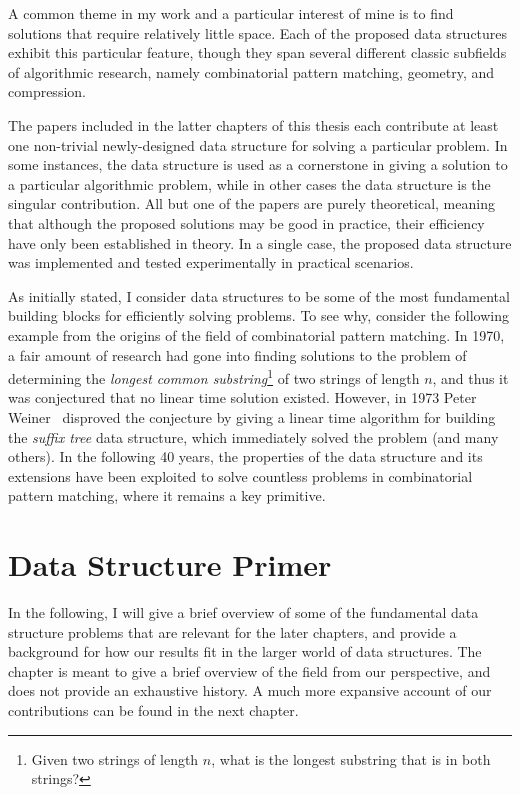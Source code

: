 A common theme in my work and a particular interest of mine is to find solutions that require relatively little space. Each of the proposed data structures exhibit this particular feature, though they span several different classic subfields of algorithmic research, namely combinatorial pattern matching, geometry, and compression. 

The papers included in the latter chapters of this thesis each contribute at least one non-trivial newly-designed data structure for solving a particular problem. In some instances, the data structure is used as a cornerstone in giving a solution to a particular algorithmic problem, while in other cases the data structure is the singular contribution. All but one of the papers are purely theoretical, meaning that although the proposed solutions may be good in practice, their efficiency have only been established in theory. In a single case, the proposed data structure was implemented and tested experimentally in practical scenarios.

As initially stated, I consider data structures to be some of the most fundamental building blocks for efficiently solving problems. To see why, consider the following example from the origins of the field of combinatorial pattern matching. In 1970, a fair amount of research had gone into finding solutions to the problem of determining the \emph{longest common substring}\footnote{Given two strings of length $n$, what is the longest substring that is in both strings?} of two strings of length $n$, and thus it was conjectured that no linear time solution existed. However, in 1973 Peter Weiner~\cite{weiner1973linear} disproved the conjecture by giving a linear time algorithm for building the \emph{suffix tree} data structure, which immediately solved the problem (and many others). In the following 40 years, the properties of the data structure and its extensions have been exploited to solve countless problems in combinatorial pattern matching, where it remains a key primitive.

\section{Data Structure Primer}
In the following, I will give a brief overview of some of the fundamental data structure problems that are relevant for the later chapters, and provide a background for how our results fit in the larger world of data structures. The chapter is meant to give a brief overview of the field from our perspective, and does not provide an exhaustive history. A much more expansive account of our contributions can be found in the next chapter.

